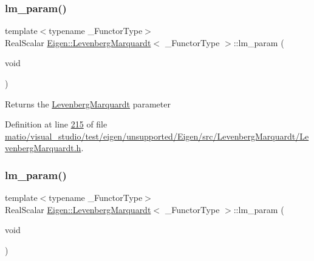 \subsubsection{\texorpdfstring{lm\+\_\+param()}{lm\_param()}\hspace{0.1cm}{\footnotesize\ttfamily [1/2]}}
{\footnotesize\ttfamily template$<$typename \+\_\+\+Functor\+Type$>$ \\
Real\+Scalar \hyperlink{class_eigen_1_1_levenberg_marquardt}{Eigen\+::\+Levenberg\+Marquardt}$<$ \+\_\+\+Functor\+Type $>$\+::lm\+\_\+param (\begin{DoxyParamCaption}\item[{void}]{ }\end{DoxyParamCaption})\hspace{0.3cm}{\ttfamily [inline]}}

\begin{DoxyReturn}{Returns}
the \hyperlink{class_eigen_1_1_levenberg_marquardt}{Levenberg\+Marquardt} parameter 
\end{DoxyReturn}


Definition at line \hyperlink{matio_2visual__studio_2test_2eigen_2unsupported_2_eigen_2src_2_levenberg_marquardt_2_levenberg_marquardt_8h_source_l00215}{215} of file \hyperlink{matio_2visual__studio_2test_2eigen_2unsupported_2_eigen_2src_2_levenberg_marquardt_2_levenberg_marquardt_8h_source}{matio/visual\+\_\+studio/test/eigen/unsupported/\+Eigen/src/\+Levenberg\+Marquardt/\+Levenberg\+Marquardt.\+h}.

\mbox{\label{class_eigen_1_1_levenberg_marquardt_aa8aa0d8c1dab58ac51df999587609e09}} 
\subsubsection{\texorpdfstring{lm\+\_\+param()}{lm\_param()}\hspace{0.1cm}{\footnotesize\ttfamily [2/2]}}
{\footnotesize\ttfamily template$<$typename \+\_\+\+Functor\+Type$>$ \\
Real\+Scalar \hyperlink{class_eigen_1_1_levenberg_marquardt}{Eigen\+::\+Levenberg\+Marquardt}$<$ \+\_\+\+Functor\+Type $>$\+::lm\+\_\+param (\begin{DoxyParamCaption}\item[{void}]{ }\end{DoxyParamCaption})\hspace{0.3cm}{\ttfamily [inline]}}

